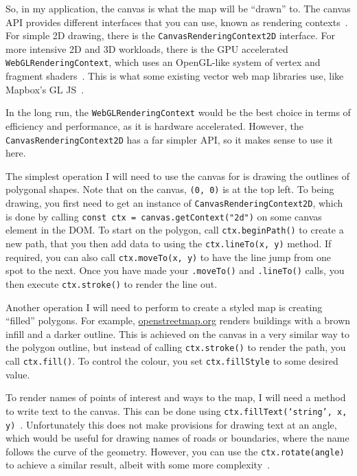 \documentclass[]{final_report}
\begin{document}
So, in my application, the canvas is what the map will be ``drawn'' to. The canvas API provides different interfaces that you can use, known as rendering contexts~\cite{mdn-canvas-api}. For simple 2D drawing, there is the \texttt{CanvasRenderingContext2D} interface. For more intensive 2D and 3D workloads, there is the GPU accelerated \texttt{WebGLRenderingContext}, which uses an OpenGL-like system of vertex and fragment shaders~\cite{mdn-web-gl}. This is what some existing vector web map libraries use, like Mapbox's GL JS~\cite{mapbox-gl-js}.

In the long run, the \texttt{WebGLRenderingContext} would be the best choice in terms of efficiency and performance, as it is hardware accelerated. However, the \texttt{Canvas\-Rendering\-Context2D} has a far simpler API, so it makes sense to use it here.

The simplest operation I will need to use the canvas for is drawing the outlines of polygonal shapes. Note that on the canvas, \texttt{(0, 0)} is at the top left. To being drawing, you first need to get an instance of \texttt{Canvas\-Rendering\-Context2D}, which is done by calling \texttt{const ctx = canvas.getContext("2d")} on some canvas element in the DOM\@. To start on the polygon, call \texttt{ctx.beginPath()} to create a new path, that you then add data to using the \texttt{ctx.lineTo(x, y)} method. If required, you can also call \texttt{ctx.moveTo(x, y)} to have the line jump from one spot to the next. Once you have made your \texttt{.moveTo()} and \texttt{.lineTo()} calls, you then execute \texttt{ctx.stroke()} to render the line out.

Another operation I will need to perform to create a styled map is creating ``filled'' polygons. For example, \href{https://openstreetmap.org}{openstreetmap.org} renders buildings with a brown infill and a darker outline. This is achieved on the canvas in a very similar way to the polygon outline, but instead of calling \texttt{ctx.stroke()} to render the path, you call \texttt{ctx.fill()}. To control the colour, you set \texttt{ctx.fillStyle} to some desired value.

To render names of points of interest and ways to the map, I will need a method to write text to the canvas. This can be done using \texttt{ctx.fillText(`string', x, y)}~\cite{mdn-canvas-draw-text}. Unfortunately this does not make provisions for drawing text at an angle, which would be useful for drawing names of roads or boundaries, where the name follows the curve of the geometry. However, you can use the \texttt{ctx.rotate(angle)} to achieve a similar result, albeit with some more complexity~\cite{mdn-canvas-rotating}.
\end{document}

